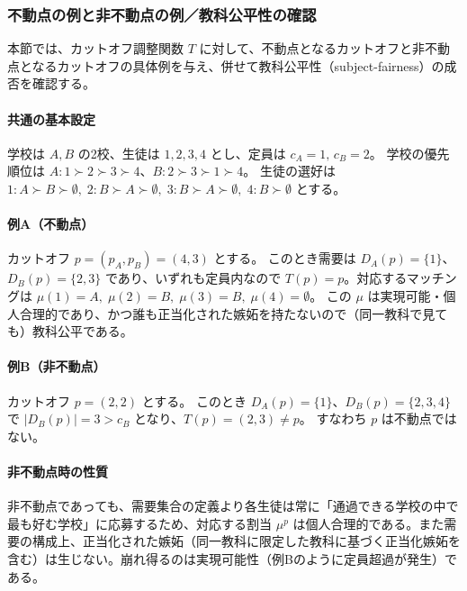 \documentclass[12pt, a4paper]{article}
\theoremstyle{definition}
\theoremstyle{remark}
\theoremstyle{plain}
\begin{document}


\subsubsection*{不動点の例と非不動点の例／教科公平性の確認}

本節では、カットオフ調整関数 $T$ に対して、不動点となるカットオフと非不動点となるカットオフの具体例を与え、併せて教科公平性（subject-fairness）の成否を確認する。

\paragraph{共通の基本設定} 学校は $A,B$ の2校、生徒は $1,2,3,4$ とし、定員は $c_A=1,\,c_B=2$。
学校の優先順位は $A: 1 \succ 2 \succ 3 \succ 4$、$B: 2 \succ 3 \succ 1 \succ 4$。
生徒の選好は $1: A \succ B \succ \emptyset,\; 2: B \succ A \succ \emptyset,\; 3: B \succ A \succ \emptyset,\; 4: B \succ \emptyset$ とする。

\paragraph{例A（不動点）} カットオフ $p=(p_A,p_B)=(4,3)$ とする。
このとき需要は $D_A(p)=\{1\}$、$D_B(p)=\{2,3\}$ であり、いずれも定員内なので $T(p)=p$。対応するマッチングは
$\mu(1)=A,\;\mu(2)=B,\;\mu(3)=B,\;\mu(4)=\emptyset$。
この $\mu$ は実現可能・個人合理的であり、かつ誰も正当化された嫉妬を持たないので（同一教科で見ても）教科公平である。

\paragraph{例B（非不動点）} カットオフ $p=(2,2)$ とする。
このとき $D_A(p)=\{1\}$、$D_B(p)=\{2,3,4\}$ で $|D_B(p)|=3>c_B$ となり、$T(p)=(2,3)\neq p$。
すなわち $p$ は不動点ではない。

\paragraph{非不動点時の性質} 非不動点であっても、需要集合の定義より各生徒は常に「通過できる学校の中で最も好む学校」に応募するため、対応する割当 $\mu^p$ は個人合理的である。また需要の構成上、正当化された嫉妬（同一教科に限定した教科に基づく正当化嫉妬を含む）は生じない。崩れ得るのは実現可能性（例Bのように定員超過が発生）である。
\end{document}

